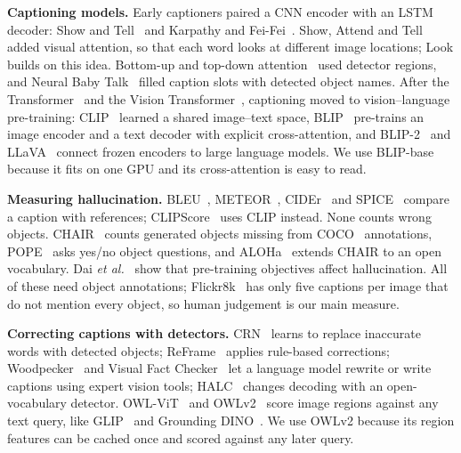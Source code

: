 \documentclass[conference]{IEEEtran}
\begin{document}
\textbf{Captioning models.} Early captioners paired a CNN encoder with an LSTM decoder: Show and
Tell~\cite{vinyals2015show} and Karpathy and Fei-Fei~\cite{karpathy2015deep}. Show, Attend and
Tell~\cite{xu2015show} added visual attention, so that each word looks at different image locations; Look
builds on this idea. Bottom-up and top-down attention~\cite{anderson2018bottom} used detector regions, and
Neural Baby Talk~\cite{lu2018neural} filled caption slots with detected object names. After the
Transformer~\cite{vaswani2017attention} and the Vision Transformer~\cite{dosovitskiy2021image}, captioning moved
to vision--language pre-training: CLIP~\cite{radford2021learning} learned a shared image--text space,
BLIP~\cite{li2022blip} pre-trains an image encoder and a text decoder with explicit cross-attention, and
BLIP-2~\cite{li2023blip2} and LLaVA~\cite{liu2023visual} connect frozen encoders to large language models. We
use BLIP-base because it fits on one GPU and its cross-attention is easy to read.

\textbf{Measuring hallucination.} BLEU~\cite{papineni2002bleu}, METEOR~\cite{banerjee2005meteor},
CIDEr~\cite{vedantam2015cider} and SPICE~\cite{anderson2016spice} compare a caption with references;
CLIPScore~\cite{hessel2021clipscore} uses CLIP instead. None counts wrong objects.
CHAIR~\cite{rohrbach2018object} counts generated objects missing from COCO~\cite{lin2014microsoft}
annotations, POPE~\cite{li2023evaluating} asks yes/no object questions, and ALOHa~\cite{petryk2024aloha}
extends CHAIR to an open vocabulary. Dai \emph{et al.}~\cite{dai2023plausible} show that pre-training
objectives affect hallucination. All of these need object annotations; Flickr8k~\cite{hodosh2013framing} has
only five captions per image that do not mention every object, so human judgement is our main measure.

\textbf{Correcting captions with detectors.} CRN~\cite{feng2020cascaded} learns to replace inaccurate words
with detected objects; ReFrame~\cite{adhikary2024reframe} applies rule-based corrections;
Woodpecker~\cite{yin2024woodpecker} and Visual Fact Checker~\cite{ge2024visual} let a language model rewrite
or write captions using expert vision tools; HALC~\cite{chen2024halc} changes decoding with an
open-vocabulary detector. OWL-ViT~\cite{minderer2022simple} and OWLv2~\cite{minderer2023scaling} score image
regions against any text query, like GLIP~\cite{li2022grounded} and Grounding DINO~\cite{liu2024grounding}. We
use OWLv2 because its region features can be cached once and scored against any later query.
\end{document}
